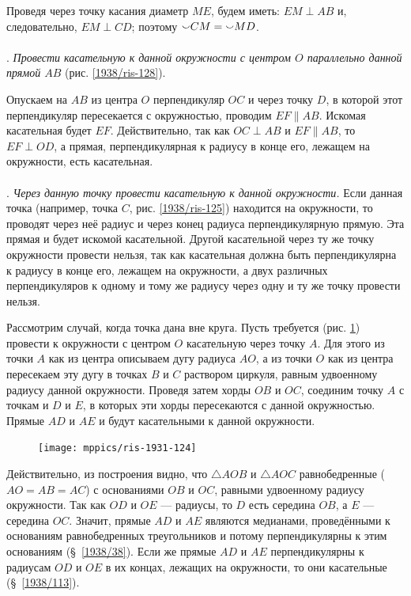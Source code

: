 \documentclass[oneside]{book}
\begin{document}
Проведя через точку касания диаметр $ME$, будем иметь:
$EM\perp AB$ и, следовательно, $EM\perp CD$;
поэтому ${\smallsmile}CM\z={\smallsmile}MD$.

\paragraph{}\label{1938/115}
\mbox{.}
\emph{Провести касательную к данной окружности с центром $O$ параллельно данной прямой $AB$} (рис. \ref{1938/ris-128}).

Опускаем на $AB$ из центра $O$ перпендикуляр $OC$ и через точку $D$, в которой этот перпендикуляр пересекается с окружностью, проводим $EF\parallel AB$.
Искомая касательная будет $EF$.
Действительно, так как $OC\perp AB$ и $EF\parallel AB$, то $EF\perp OD$, а прямая, перпендикулярная к радиусу в конце его, лежащем на окружности, есть касательная.

\paragraph{}\label{1931/115}
\mbox{.}
\emph{Через данную точку провести касательную к данной окружности.}
Если данная точка (например, точка $C$, рис. \ref{1938/ris-125}) находится на окружности, то проводят через неё радиус и через конец радиуса перпендикулярную прямую.
Эта прямая и будет искомой касательной.
Другой касательной через ту же точку окружности провести нельзя, так как касательная должна быть перпендикулярна к радиусу в конце его, лежащем на окружности, а двух различных перпендикуляров к одному и тому же радиусу через одну и ту же точку провести нельзя.

Рассмотрим случай, когда точка дана вне круга.
Пусть требуется (рис. \ref{1931/ris-124}) провести к окружности с центром $O$ касательную через точку $A$.
Для этого из точки $A$ как из центра описываем дугу радиуса $AO$, а из точки $O$ как из центра пересекаем эту дугу в точках $B$ и $C$ раствором циркуля, равным удвоенному радиусу данной окружности.
Проведя затем хорды $OB$ и $OC$, соединим точку $A$ с точкам и $D$ и $E$, в которых эти хорды пересекаются с
данной окружностью.
Прямые $AD$ и $AE$ и будут касательными к данной окружности.

\begin{figure}
\centering
\texttt{[image: mppics/ris-1931-124]}
\caption{}\label{1931/ris-124}
\end{figure}

Действительно, из построения видно, что $\triangle AOB$ и $\triangle AOC$ равнобедренные ($AO=AB=AC$) с основаниями $OB$ и $OC$, равными удвоенному радиусу окружности.
Так как $OD$ и $OE$ --- радиусы, то $D$ есть середина $OB$, а $E$ --- середина $OC$.
Значит, прямые $AD$ и $AE$ являются медианами, проведёнными к основаниям равнобедренных треугольников и потому перпендикулярны к этим основаниям (§~\ref{1938/38}).
Если же прямые $AD$ и $AE$ перпендикулярны к радиусам $OD$ и $OE$ в их концах, лежащих
на окружности, то они касательные (§~\ref{1938/113}).
\end{document}
